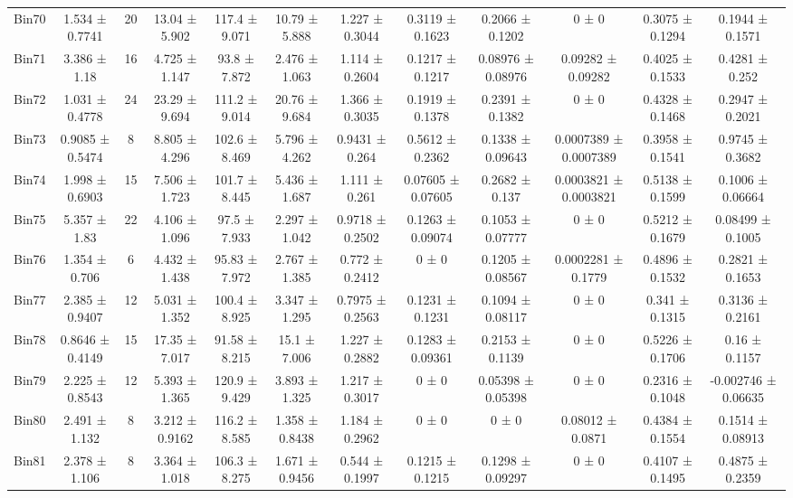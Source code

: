 \begin{tabular}{@{\extracolsep{4pt}}lccccccccccc@{}}
     Bin70 & 1.534 ± 0.7741 & 20 & 13.04 ± 5.902 & 117.4 ± 9.071 & 10.79 ± 5.888 & 1.227 ± 0.3044 & 0.3119 ± 0.1623 & 0.2066 ± 0.1202 & 0 ± 0 & 0.3075 ± 0.1294 & 0.1944 ± 0.1571 \\ 
     Bin71 & 3.386 ± 1.18 & 16 & 4.725 ± 1.147 & 93.8 ± 7.872 & 2.476 ± 1.063 & 1.114 ± 0.2604 & 0.1217 ± 0.1217 & 0.08976 ± 0.08976 & 0.09282 ± 0.09282 & 0.4025 ± 0.1533 & 0.4281 ± 0.252 \\ 
     Bin72 & 1.031 ± 0.4778 & 24 & 23.29 ± 9.694 & 111.2 ± 9.014 & 20.76 ± 9.684 & 1.366 ± 0.3035 & 0.1919 ± 0.1378 & 0.2391 ± 0.1382 & 0 ± 0 & 0.4328 ± 0.1468 & 0.2947 ± 0.2021 \\ 
     Bin73 & 0.9085 ± 0.5474 & 8 & 8.805 ± 4.296 & 102.6 ± 8.469 & 5.796 ± 4.262 & 0.9431 ± 0.264 & 0.5612 ± 0.2362 & 0.1338 ± 0.09643 & 0.0007389 ± 0.0007389 & 0.3958 ± 0.1541 & 0.9745 ± 0.3682 \\ 
     Bin74 & 1.998 ± 0.6903 & 15 & 7.506 ± 1.723 & 101.7 ± 8.445 & 5.436 ± 1.687 & 1.111 ± 0.261 & 0.07605 ± 0.07605 & 0.2682 ± 0.137 & 0.0003821 ± 0.0003821 & 0.5138 ± 0.1599 & 0.1006 ± 0.06664 \\ 
     Bin75 & 5.357 ± 1.83 & 22 & 4.106 ± 1.096 & 97.5 ± 7.933 & 2.297 ± 1.042 & 0.9718 ± 0.2502 & 0.1263 ± 0.09074 & 0.1053 ± 0.07777 & 0 ± 0 & 0.5212 ± 0.1679 & 0.08499 ± 0.1005 \\ 
     Bin76 & 1.354 ± 0.706 & 6 & 4.432 ± 1.438 & 95.83 ± 7.972 & 2.767 ± 1.385 & 0.772 ± 0.2412 & 0 ± 0 & 0.1205 ± 0.08567 & 0.0002281 ± 0.1779 & 0.4896 ± 0.1532 & 0.2821 ± 0.1653 \\ 
     Bin77 & 2.385 ± 0.9407 & 12 & 5.031 ± 1.352 & 100.4 ± 8.925 & 3.347 ± 1.295 & 0.7975 ± 0.2563 & 0.1231 ± 0.1231 & 0.1094 ± 0.08117 & 0 ± 0 & 0.341 ± 0.1315 & 0.3136 ± 0.2161 \\ 
     Bin78 & 0.8646 ± 0.4149 & 15 & 17.35 ± 7.017 & 91.58 ± 8.215 & 15.1 ± 7.006 & 1.227 ± 0.2882 & 0.1283 ± 0.09361 & 0.2153 ± 0.1139 & 0 ± 0 & 0.5226 ± 0.1706 & 0.16 ± 0.1157 \\ 
     Bin79 & 2.225 ± 0.8543 & 12 & 5.393 ± 1.365 & 120.9 ± 9.429 & 3.893 ± 1.325 & 1.217 ± 0.3017 & 0 ± 0 & 0.05398 ± 0.05398 & 0 ± 0 & 0.2316 ± 0.1048 & -0.002746 ± 0.06635 \\ 
     Bin80 & 2.491 ± 1.132 & 8 & 3.212 ± 0.9162 & 116.2 ± 8.585 & 1.358 ± 0.8438 & 1.184 ± 0.2962 & 0 ± 0 & 0 ± 0 & 0.08012 ± 0.0871 & 0.4384 ± 0.1554 & 0.1514 ± 0.08913 \\ 
     Bin81 & 2.378 ± 1.106 & 8 & 3.364 ± 1.018 & 106.3 ± 8.275 & 1.671 ± 0.9456 & 0.544 ± 0.1997 & 0.1215 ± 0.1215 & 0.1298 ± 0.09297 & 0 ± 0 & 0.4107 ± 0.1495 & 0.4875 ± 0.2359 \\ 

\end{tabular}
